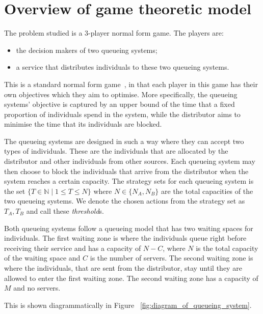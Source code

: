 \section{Overview of game theoretic model} \label{sec:model_overview}

The problem studied is a 3-player normal form game. The players are:
  
\begin{itemize}
    \item the decision makers of two queueing systems;
    \item a service that distributes individuals to these two queueing systems.
\end{itemize}

This is a standard normal form game~\cite{Maschler2013},  
in that each player in this game has their own objectives which they aim to 
optimise.
More specifically, the queueing systems' objective is captured by an upper bound
of the time that a fixed proportion of individuals spend in the system, 
while the distributor aims to minimise the time that its individuals 
are blocked.

The queueing systems are designed in such a way where they can accept two types
of individuals. 
These are the individuals that are allocated by the distributor and 
other individuals from other sources. 
Each queueing system may then choose to block the individuals that arrive from 
the distributor when the system reaches a certain capacity. 
The strategy sets for each queueing system is the set 
\( \{T \in \mathbb{N} \;|\; 1 \leq T \leq N\} \) where \(N \in\{N_A, N_B\}\) are 
the total capacities of the two queueing systems. We denote the chosen actions 
from the strategy set as \(T_A, T_B\) and call these \textit{threshold}s.

Both queueing systems follow a queueing model that has two waiting spaces for 
individuals. 
The first waiting zone is where the individuals queue right before receiving 
their service and has a capacity of \( N - C \), where \(N\) is the total 
capacity of the waiting space and \(C\) is the number of servers. 
The second waiting zone is where the individuals, that are sent from the 
distributor, stay until they are allowed to enter the first waiting zone.
The second waiting zone has a capacity of \(M\) and no servers.

This is shown diagrammatically in Figure ~\ref{fig:diagram_of_queueing_system}.

